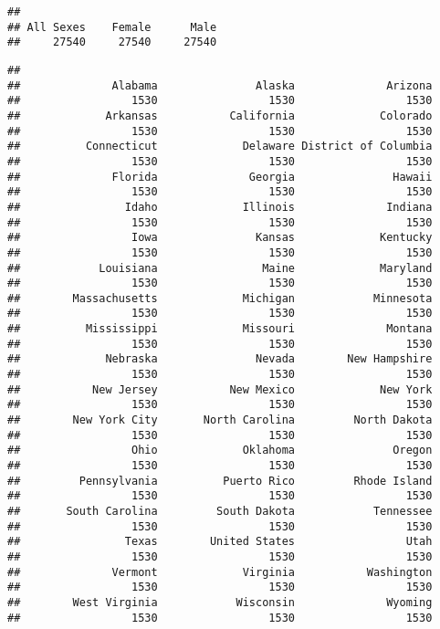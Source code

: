 \documentclass[
]{article}
\newenvironment{Shaded}{\begin{snugshade}}{\end{snugshade}}
\newcommand{\FunctionTok}[1]{\textcolor[rgb]{0.00,0.00,0.00}{#1}}
\newcommand{\NormalTok}[1]{#1}
\newcommand{\SpecialCharTok}[1]{\textcolor[rgb]{0.00,0.00,0.00}{#1}}
\begin{document}
\begin{verbatim}
## 
## All Sexes    Female      Male 
##     27540     27540     27540
\end{verbatim}

\begin{Shaded}
\end{Shaded}

\begin{verbatim}
## 
##              Alabama               Alaska              Arizona 
##                 1530                 1530                 1530 
##             Arkansas           California             Colorado 
##                 1530                 1530                 1530 
##          Connecticut             Delaware District of Columbia 
##                 1530                 1530                 1530 
##              Florida              Georgia               Hawaii 
##                 1530                 1530                 1530 
##                Idaho             Illinois              Indiana 
##                 1530                 1530                 1530 
##                 Iowa               Kansas             Kentucky 
##                 1530                 1530                 1530 
##            Louisiana                Maine             Maryland 
##                 1530                 1530                 1530 
##        Massachusetts             Michigan            Minnesota 
##                 1530                 1530                 1530 
##          Mississippi             Missouri              Montana 
##                 1530                 1530                 1530 
##             Nebraska               Nevada        New Hampshire 
##                 1530                 1530                 1530 
##           New Jersey           New Mexico             New York 
##                 1530                 1530                 1530 
##        New York City       North Carolina         North Dakota 
##                 1530                 1530                 1530 
##                 Ohio             Oklahoma               Oregon 
##                 1530                 1530                 1530 
##         Pennsylvania          Puerto Rico         Rhode Island 
##                 1530                 1530                 1530 
##       South Carolina         South Dakota            Tennessee 
##                 1530                 1530                 1530 
##                Texas        United States                 Utah 
##                 1530                 1530                 1530 
##              Vermont             Virginia           Washington 
##                 1530                 1530                 1530 
##        West Virginia            Wisconsin              Wyoming 
##                 1530                 1530                 1530
\end{verbatim}
\end{document}
